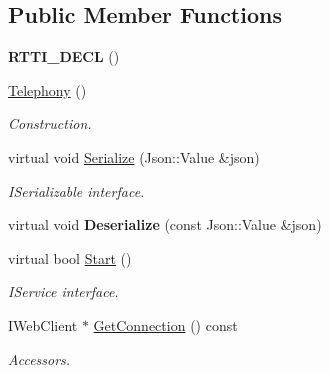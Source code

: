 \subsection*{Public Member Functions}
\begin{DoxyCompactItemize}
\item 
\mbox{\label{class_telephony_ab9de300c7e8437f7ea2cc38040b80cb7}} 
{\bfseries R\+T\+T\+I\+\_\+\+D\+E\+CL} ()
\item 
\mbox{\label{class_telephony_a96a183ef350e87c4471cdfcde3138829}} 
\hyperlink{class_telephony_a96a183ef350e87c4471cdfcde3138829}{Telephony} ()
\begin{DoxyCompactList}\small\item\em Construction. \end{DoxyCompactList}\item 
\mbox{\label{class_telephony_a56b3b1913c335cfae7ed4e53e7718451}} 
virtual void \hyperlink{class_telephony_a56b3b1913c335cfae7ed4e53e7718451}{Serialize} (Json\+::\+Value \&json)
\begin{DoxyCompactList}\small\item\em I\+Serializable interface. \end{DoxyCompactList}\item 
\mbox{\label{class_telephony_a6ffe691f3bfef560de249d61708db274}} 
virtual void {\bfseries Deserialize} (const Json\+::\+Value \&json)
\item 
\mbox{\label{class_telephony_a9db040465debbf79deb0ec189fa9fff2}} 
virtual bool \hyperlink{class_telephony_a9db040465debbf79deb0ec189fa9fff2}{Start} ()
\begin{DoxyCompactList}\small\item\em I\+Service interface. \end{DoxyCompactList}\item 
\mbox{\label{class_telephony_a1789d6678798304ca956035a43c8228d}} 
I\+Web\+Client $\ast$ \hyperlink{class_telephony_a1789d6678798304ca956035a43c8228d}{Get\+Connection} () const
\begin{DoxyCompactList}\small\item\em Accessors. \end{DoxyCompactList}\item 

\end{DoxyCompactItemize}
